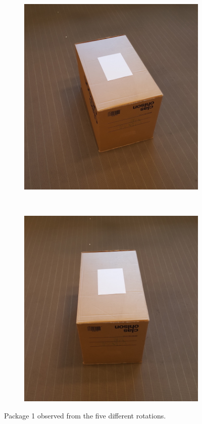 \begin{figure}
	\begin{subfigure}[b]{0.2\textwidth}
		\includegraphics[width=\textwidth]{figures/angle_4.jpg}
		\label{fig:angle_4}
	\end{subfigure}
	~
	\begin{subfigure}[b]{0.2\textwidth}
		\includegraphics[width=\textwidth]{figures/angle_5.jpg}
		\label{fig:angle_5}
	\end{subfigure}
	\caption{Package 1 observed from the five different rotations.}\label{fig:positions}
\end{figure}